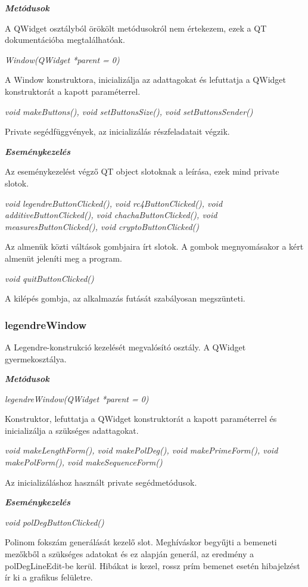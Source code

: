 \documentclass[hidelinks, 12pt]{article}
\begin{document}
\textit{\textbf{Metódusok}}

A QWidget osztályból örökölt metódusokról nem értekezem, ezek a QT dokumentációba megtalálhatóak.

\textit{Window(QWidget *parent = 0)}

A Window konstruktora, inicializálja az adattagokat és lefuttatja a QWidget konstruktorát a kapott paraméterrel.

\textit{void makeButtons(), void setButtonsSize(), void setButtonsSender()}

Private segédfüggvények, az inicializálás részfeladatait végzik.

\textit{\textbf{Eseménykezelés}}

Az eseménykezelést végző QT object slotoknak a leírása, ezek mind private slotok.

\textit{void legendreButtonClicked(), void rc4ButtonClicked(), void additiveButtonClicked(), void chachaButtonClicked(), void measuresButtonClicked(), void cryptoButtonClicked()}

Az almenük közti váltások gombjaira írt slotok. A gombok megnyomásakor a kért almenüt jeleníti meg a program.

\textit{void quitButtonClicked()}

A kilépés gombja, az alkalmazás futását szabályosan megszünteti.

\subsubsection*{legendreWindow}

A Legendre-konstrukció kezelését megvalósító osztály. A QWidget gyermekosztálya.

\textbf{\textit{Metódusok}}

\textit{legendreWindow(QWidget *parent = 0)}

Konstruktor, lefuttatja a QWidget konstruktorát a kapott paraméterrel és inicializálja a szükséges adattagokat.

\textit{void makeLengthForm(), void makePolDeg(), void makePrimeForm(), void makePolForm(), void makeSequenceForm()}

Az inicializáláshoz használt private segédmetódusok.

\textbf{\textit{Eseménykezelés}}

\textit{void polDegButtonClicked()}

Polinom fokszám generálását kezelő slot. Meghíváskor begyűjti a bemeneti mezőkből a szükséges adatokat és ez alapján generál, az eredmény a polDegLineEdit-be kerül.
Hibákat is kezel, rossz prím bemenet esetén hibajelzést ír ki a grafikus felületre.
\end{document}
